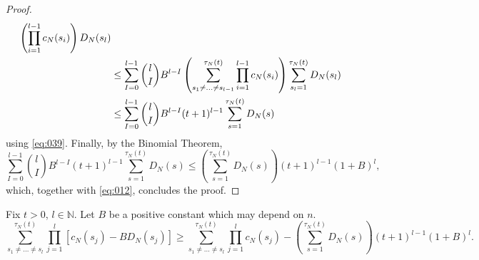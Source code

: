 \begin{proof}
\begin{align}
        \left( \prod_{i=1}^{l-1} c_N(s_i) \right) D_N(s_l) \notag\\
&\leq \sum_{I=0}^{l-1}\binom{l}{I} B^{l-I} 
        \left( \sum_{s_1\neq\dots\neq s_{l-1}}^{\tau_N(t)} 
        \prod_{i=1}^{l-1} c_N(s_i) \right) 
        \sum_{s_l=1}^{\tau_N(t)} D_N(s_l) \notag\\
&\leq \sum_{I=0}^{l-1}\binom{l}{I} B^{l-I} (t+1)^{l-1}
        \sum_{s=1}^{\tau_N(t)} D_N(s) \label{eq:013}
\end{align}
using \eqref{eq:039}.
Finally, by the Binomial Theorem,
\begin{equation}\label{eq:014}
\sum_{I=0}^{l-1}\binom{l}{I} B^{l-I} (t+1)^{l-1}
        \sum_{s=1}^{\tau_N(t)} D_N(s)
\leq \left( \sum_{s=1}^{\tau_N(t)} D_N(s) \right) (t+1)^{l-1} (1+B)^l ,
\end{equation}
which, together with \eqref{eq:012}, concludes the proof.
\end{proof}


\begin{lemma}\label{thm:sumprod3}
Fix $t>0$, $l\in\mathbb{N}$.
Let $B$ be a positive constant which may depend on $n$.
\begin{equation*}
\sum_{s_1\neq\dots\neq s_l}^{\tau_N(t)} \prod_{j=1}^l 
        \left[ c_N(s_j) - B D_N(s_j) \right]
\geq \sum_{s_1\neq\dots\neq s_l}^{\tau_N(t)} \prod_{j=1}^l c_N(s_j)
        - \left( \sum_{s=1}^{\tau_N(t)} D_N(s) \right) (t+1)^{l-1} (1+B)^l .
\end{equation*}
\end{lemma}

